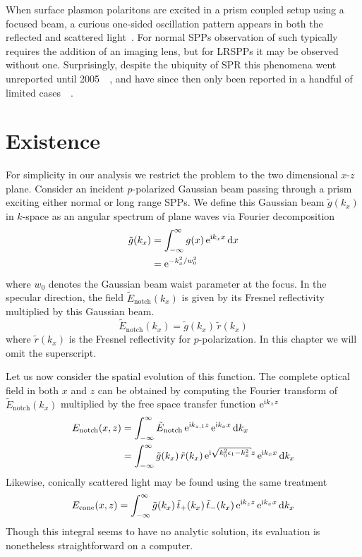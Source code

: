 When surface plasmon polaritons are excited in a prism coupled setup using
a focused beam, a curious one-sided oscillation pattern appears in both the
reflected and scattered light~\cite{webster2013interference}.  For normal
SPPs observation of such typically requires the addition of an imaging
lens, but for LRSPPs it may be observed without one.  Surprisingly, despite
the ubiquity of SPR this phenomena went unreported until
2005~\cite{schumann2008near}~\cite{andaloro2005optical}, and have since
then only been reported in a handful of limited
cases~\cite{shan2009measuring}~\cite{simon2007observation}. 

\section{Existence}
For simplicity in our analysis we restrict the problem to the two
dimensional $x$-$z$ plane.  Consider an incident $p$-polarized Gaussian
beam passing through a prism exciting either normal or long range SPPs.  We
define this Gaussian beam $\tilde{g}(k_x)$ in $k$-space as an angular
spectrum of plane waves via Fourier decomposition
\begin{align}
\tilde{g}(k_x) &= \int_{-\infty}^{\infty} g(x)\, {\mathrm{e}}^{{\mathrm{i}} k_x x} \,\mathrm{d} x\\
&={\mathrm{e}}^{-k_x^2/w_0^2}
\end{align}
where $w_0$ denotes the Gaussian beam waist parameter at the focus.  In the
specular direction, the field $\tilde{E}_\mathrm{notch}(k_x)$ is given by its
Fresnel reflectivity multiplied by this Gaussian beam.
\begin{equation}
\tilde{E}_\mathrm{notch}(k_x)=\tilde{g}(k_x)\,\tilde{r}(k_x)
\end{equation}
where $\tilde{r}(k_x)$ is the Fresnel reflectivity for $p$-polarization.
In this chapter we will omit the superscript.

Let us now consider the spatial evolution of this function.  
The complete optical field in both $x$ and $z$ can be obtained by computing
the Fourier transform of $\tilde{E}_\mathrm{notch}(k_x)$ multiplied 
by the free space transfer function ${\mathrm{e}}^{{\mathrm{i}} k_{z} z}$
\begin{align}
E_\mathrm{notch}(x,z) &= \intinfty \tilde{E}_\mathrm{notch}\, \me^{\mi k_{z,1} z}\, \me^{\mi k_x x} \md k_x\\
 &= \intinfty \tilde{g}(k_x)\, \tilde{r}(k_x)\, \me^{\mi \sqrt{k_0^2 \epsilon_1 - k_x^2}z}\, \me^{\mi k_x x} \md k_x
\label{eqn:fourier123}
\end{align}
Likewise, conically scattered light may be found using the same treatment
\begin{align}
E_\text{cone}(x,z) = \int_{-\infty}^{\infty} \tilde{g}(k_x)\, 
\tilde{t}_+(k_x)\, \tilde{t}_-(k_x)\,{\mathrm{e}}^{{\mathrm{i}} k_z z}\, {\mathrm{e}}^{{\mathrm{i}} k_x x} \,\mathrm{d} k_x
\label{eqn:fourier321}
\end{align}
Though this integral seems to have no analytic solution, its evaluation is
nonetheless straightforward on a computer.

